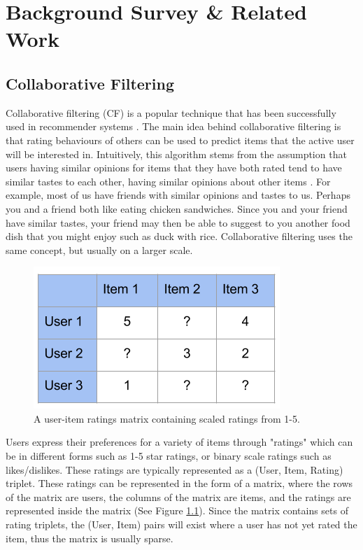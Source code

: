 \chapter{Background Survey \& Related Work}\label{C:background}

\section{Collaborative Filtering}

Collaborative filtering (CF) is a popular technique that has been successfully used in recommender systems \cite{itembased, schafer2007collaborative, survey}. The main idea behind collaborative filtering is that rating behaviours of others can be used to predict items that the active user will be interested in. Intuitively, this algorithm stems from the assumption that users having similar opinions for items that they have both rated tend to have similar tastes to each other, having similar opinions about other items  \cite{schafer2007collaborative}. For example, most of us have friends with similar opinions and tastes to us. Perhaps you and a friend both like eating chicken sandwiches. Since you and your friend have similar tastes, your friend may then be able to suggest to you another food dish that you might enjoy such as duck with rice. Collaborative filtering uses the same concept, but usually on a larger scale. 

\begin{figure}
\centering
\includegraphics[scale=0.7]{User-Item}
\caption{A user-item ratings matrix containing scaled ratings from 1-5.}
\label{fig:matrix}
\end{figure}

Users express their preferences for a variety of items through "ratings" which can be in different forms such as 1-5 star ratings, or binary scale ratings such as likes/dislikes. These ratings are typically represented as a (User, Item, Rating) triplet. These ratings can be represented in the form of a matrix, where the rows of the matrix are users, the columns of the matrix are items, and the ratings are represented inside the matrix (See Figure \ref{fig:matrix}). Since the matrix contains sets of rating triplets, the (User, Item) pairs will exist where a user has not yet rated the item, thus the matrix is usually sparse.

